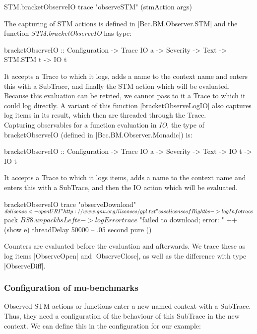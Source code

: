 \begin{spec}
    STM.bracketObserveIO trace "observeSTM" (stmAction args)
\end{spec}

The capturing of STM actions is defined in |Bcc.BM.Observer.STM| and the
function \emph{STM.bracketObserveIO} has type:
\begin{spec}
    bracketObserveIO
        :: Configuration
        -> Trace IO a
        -> Severity
        -> Text
        -> STM.STM t
        -> IO t
\end{spec}
It accepts a Trace to which it logs, adds a name to the context name and enters
this with a SubTrace, and finally the STM action which will be evaluated.
Because this evaluation can be retried, we cannot pass to it a Trace to which it
could log directly. A variant of this function |bracketObserveLogIO| also
captures log items in its result, which then are threaded through the Trace.
\\
Capturing observables for a function evaluation in \emph{IO}, the type of
\mbox{bracketObserveIO} (defined in |Bcc.BM.Observer.Monadic|) is:
\begin{spec}
    bracketObserveIO
        :: Configuration
        -> Trace IO a
        -> Severity
        -> Text
        -> IO t
        -> IO t
\end{spec}

It accepts a Trace to which it logs items, adds a name to the context name and
enters this with a SubTrace, and then the IO action which will be evaluated.

\begin{spec}
    bracketObserveIO trace "observeDownload" $ do
        license <- openURI "http://www.gnu.org/licenses/gpl.txt"
        case license of
            Right bs -> logInfo trace $ pack $ BS8.unpack bs
            Left e   -> logError trace $ "failed to download; error: " ++ (show e)
        threadDelay 50000  -- .05 second
        pure ()
\end{spec}

Counters are evaluated before the evaluation and afterwards. We trace these as
log items |ObserveOpen| and |ObserveClose|, as well as the difference
with type |ObserveDiff|.

\subsubsection{Configuration of mu-benchmarks}

Observed STM actions or functions enter a new named context with a SubTrace.
Thus, they need a configuration of the behaviour of this SubTrace in the new
context. We can define this in the configuration for our example:


